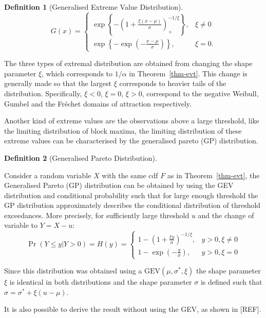 \documentclass[
  10pt,
  a4paper,
]{scrreprt}
\theoremstyle{plain}
\theoremstyle{plain}
\theoremstyle{plain}
\theoremstyle{definition}
\newtheorem{definition}{Definition}[section]
\theoremstyle{remark}
\begin{document}
{\begin{definition}[Generalised Extreme Value
Distribution]
\[
G(x) = \begin{cases}\exp\left\{-\left(1+\displaystyle\frac{\xi(x-\mu)}{\sigma}\right)_+^{-1/\xi}\right\},&\xi\ne0\\
\exp\left\{-\exp\left(-\displaystyle\frac{x-\mu}{\sigma}\right)\right\},&\xi=0.
\end{cases}
\]

\end{definition}

The three types of extremal distribution are obtained from changing the
shape parameter \(\xi\), which corresponds to \(1/\alpha\) in
Theorem~\ref{thm-evt}. This change is generally made so that the largest
\(\xi\) corresponds to heavier tails of the distribution. Specifically,
\(\xi<0\), \(\xi=0\), \(\xi>0\), correspond to the negative Weibull,
Gumbel and the Fréchet domains of attraction respectively.

Another kind of extreme values are the observations above a large
threshold, like the limiting distribution of block maxima, the limiting
distribution of these extreme values can be characterised by the
generalised pareto (GP) distribution.

\begin{definition}[Generalised Pareto
Distribution]\protect\hypertarget{def-gp}{}\label{def-gp}

Consider a random variable \(X\) with the same cdf \(F\) as in
Theorem~\ref{thm-evt}, the Generalised Pareto (GP) distribution can be
obtained by using the GEV distribution and conditional probability such
that for large enough threshold the GP distribution approximately
describes the conditional distribution of threshold exceedances. More
precisely, for sufficiently large threshold \(u\) and the change of
variable to \(Y=X-u\): \[
\Pr(Y\le y | Y>0) = H(y) = \begin{cases}
1-\left(1+\displaystyle\frac{\xi y}{\sigma}\right)^{-1/\xi},&y>0,\xi\ne 0 \\
1-\exp\left(-\displaystyle\frac{y}{\sigma}\right),&y>0,\xi = 0
\end{cases}
\]

\end{definition}

Since this distribution was obtained using a
\(\text{GEV}(\mu,\sigma^*,\xi)\) the shape parameter \(\xi\) is
identical in both distributions and the shape parameter \(\sigma\) is
defined such that \(\sigma = \sigma^* + \xi(u-\mu)\).

It is also possible to derive the result without using the GEV, as shown
in {[}REF{]}.

}
\end{document}
